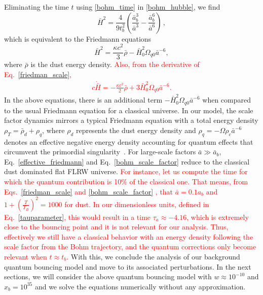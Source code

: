 \documentclass[a4paper,11pt]{article}
\newcommand{\dpar}[1]{\left(#1 \right)}
\begin{document}
        Eliminating the time $t$ using \eqref{bohm_time} in \eqref{bohm_hubble}, we find 
        \begin{equation}
        \label{friedman_scale}
            \bar{H}^{2} = \frac{ 4 }{ 9t^{2}_{b}}\dpar
{ \frac{ \bar{a}^{3}_{b} }{ \bar{a}^{3} } - \frac{\bar{a}_{b}^{6}}{ \bar{a}^{6} } }\, ,
        \end{equation}
        which is equivalent to the Friedmann equations
        \begin{equation}\label{effective_friedmann}
            \bar{H}^{2} = \frac{ \kappa c^{2} }{ 3 }\bar\rho - \bar{H}^{2}_{0}\Omega_{q0}\bar{a}^{-6},
        \end{equation}
        where $\bar\rho$ is the dust energy density. \textcolor{red}{Also, from the derivative of Eq.~\eqref{friedman_scale},
        \begin{align}
         c\dot{\bar{H}} = - \frac{\kappa c^{2}}{2} \bar\rho + 3\bar{H}^{2}_{0}\Omega_{q0}\bar{a}^{-6}    
        .\end{align}
        }
 In the above equations, there is an additional term $- \bar{H}^{2}_{0}\Omega_{q0}\bar{a}^{-6}$ when compared to the usual Friedmann equation for a classical universe. In our model, the scale factor dynamics mirrors a typical Friedmann equation with a total energy density $\rho_{T} = \bar\rho_{d} + \rho_{q}$, where {\color{red}$\rho_{d}$ represents the dust energy density and $\rho_{q} = -\Omega\rho_{c}\bar{a}^{-6}$ denotes an effective negative energy density accounting for quantum effects that circumvent the primordial singularity}~\cite{vitenti2012large}. For large-scale factors $\bar{a} \gg \bar{a}_{b} $, Eq.~\eqref{effective_friedmann} and Eq.~\eqref{bohm_scale_factor} reduce to the classical dust dominated flat FLRW universe.
        \textcolor{red}{For instance, let us compute the time for which the quantum contribution is 10\% of the classical one. That means, from Eqs.~\eqref{friedman_scale} and \eqref{bohm_scale_factor} , that $\bar{a} = 0.1 a_b$ and $1 + \left(\frac{T}{T_B}\right)^2 = 1000$ for dust. In our dimensionless units, defined in Eq.~\eqref{tauparameter}, this would result in a time $\tau_a \approx -4.16$, which is extremely close to the bouncing point and it is not relevant for our analysis. Thus, effectively we still have a classical behavior with an energy density following the scale factor from the Bohm trajectory, and the quantum corrections only become relevant when $t \approx t_b$.}
         With this, we conclude the analysis of our background quantum bouncing model and move to its associated perturbations. In the next sections, we will consider the above quantum bouncing model with $w\approx 10^{-10}$ and $x_b = 10^{35}$ and we solve the equations numerically without any approximation.
        
\end{document}
